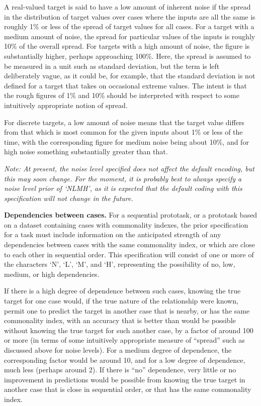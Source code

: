 A real-valued target is said to have a low amount of inherent noise if
the spread in the distribution of target values over cases where the
inputs are all the same is roughly 1\% or less of the spread of target
values for all cases.  For a target with a medium amount of noise, the
spread for particular values of the inputs is roughly 10\% of the
overall spread.  For targets with a high amount of noise, the figure
is substantially higher, perhaps approaching 100\%.  Here, the spread
is assumed to be measured in a unit such as standard deviation, but
the term is left deliberately vague, as it could be, for example, that
the standard deviation is not defined for a target that takes on
occasional extreme values.  The intent is that the rough figures of
1\% and 10\% should be interpreted with respect to some intuitively
appropriate notion of spread.

For discrete targets, a low amount of noise means that the target
value differs from that which is most common for the given inputs
about 1\% or less of the time, with the corresponding figure for
medium noise being about 10\%, and for high noise something
substantially greater than that.

{\em Note: At present, the noise level specified does not affect the
default encoding, but this may soon change.  For the moment, it is
probably best to always specify a noise level prior of `NLMH', as it
is expected that the default coding with this specification will not
change in the future.}

{\bf Dependencies between cases.\/} For a sequential prototask, or a
prototask based on a dataset containing cases with commonality
indexes, the prior specification for a task must include information
on the anticipated strength of any dependencies between cases with the
same commonality index, or which are close to each other in sequential
order.  This specification will consist of one or more of the
characters `N', `L', `M', and `H', representing the possibility of no,
low, medium, or high dependencies.

If there is a high degree of dependence between such cases, knowing
the true target for one case would, if the true nature of the
relationship were known, permit one to predict the target in another
case that is nearby, or has the same commonality index, with an
accuracy that is better than would be possible without knowing the
true target for such another case, by a factor of around 100 or more
(in terms of some intuitively appropriate measure of ``spread'' such
as discussed above for noise levels).  For a medium degree of
dependence, the corresponding factor would be around 10, and for a low
degree of dependence, much less (perhaps around 2).  If there is
``no'' dependence, very little or no improvement in predictions would
be possible from knowing the true target in another case that is close
in sequential order, or that has the same commonality index.

